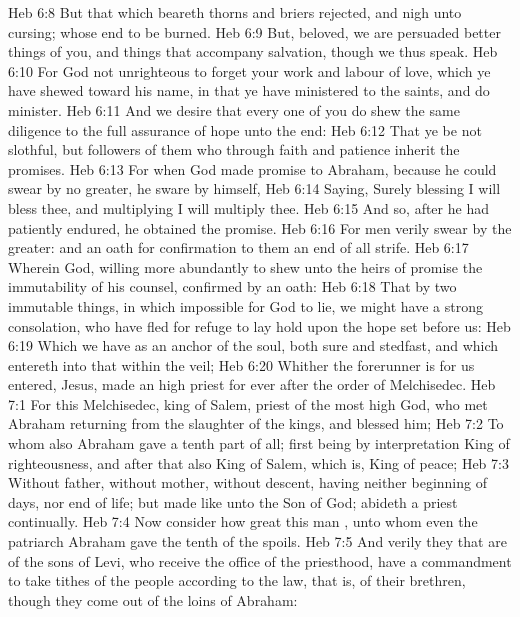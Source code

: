 \vs Heb 6:8 But that which beareth thorns and briers  rejected, and  nigh unto cursing; whose end  to be burned.
\vs Heb 6:9 But, beloved, we are persuaded better things of you, and things that accompany salvation, though we thus speak.
\vs Heb 6:10 For God  not unrighteous to forget your work and labour of love, which ye have shewed toward his name, in that ye have ministered to the saints, and do minister.
\vs Heb 6:11 And we desire that every one of you do shew the same diligence to the full assurance of hope unto the end:
\vs Heb 6:12 That ye be not slothful, but followers of them who through faith and patience inherit the promises.
\vs Heb 6:13 For when God made promise to Abraham, because he could swear by no greater, he sware by himself,
\vs Heb 6:14 Saying, Surely blessing I will bless thee, and multiplying I will multiply thee.
\vs Heb 6:15 And so, after he had patiently endured, he obtained the promise.
\vs Heb 6:16 For men verily swear by the greater: and an oath for confirmation  to them an end of all strife.
\vs Heb 6:17 Wherein God, willing more abundantly to shew unto the heirs of promise the immutability of his counsel, confirmed  by an oath:
\vs Heb 6:18 That by two immutable things, in which  impossible for God to lie, we might have a strong consolation, who have fled for refuge to lay hold upon the hope set before us:
\vs Heb 6:19 Which  we have as an anchor of the soul, both sure and stedfast, and which entereth into that within the veil;
\vs Heb 6:20 Whither the forerunner is for us entered,  Jesus, made an high priest for ever after the order of Melchisedec.
\vs Heb 7:1 For this Melchisedec, king of Salem, priest of the most high God, who met Abraham returning from the slaughter of the kings, and bles\-sed him;
\vs Heb 7:2 To whom also Abraham gave a tenth part of all; first being by interpretation King of righteousness, and after that also King of Salem, which is, King of peace;
\vs Heb 7:3 Without father, without mother, without descent, having neither beginning of days, nor end of life; but made like unto the Son of God; abideth a priest continually.
\vs Heb 7:4 Now consider how great this man , unto whom even the patriarch Abraham gave the tenth of the spoils.
\vs Heb 7:5 And verily they that are of the sons of Levi, who receive the office of the priesthood, have a commandment to take tithes of the people according to the law, that is, of their brethren, though they come out of the loins of Abraham:
